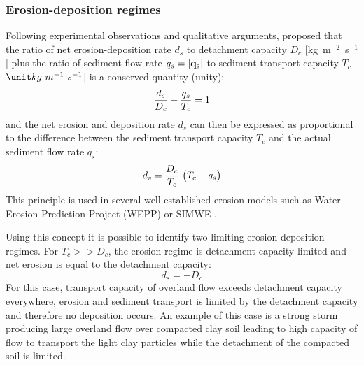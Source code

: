 \documentclass[gmd, manuscript]{copernicus}
\begin{document}
\subsubsection{Erosion-deposition regimes}

Following experimental observations and qualitative arguments, \cite{Foster1977} 
proposed that the ratio of net erosion-deposition rate $d_s$ to detachment
 capacity  $D_c$  [\unit{kg~m}$^{-2}$~\unit{s}$^{-1}$] 
 plus the ratio of sediment flow rate $q_s = |{\bf q_s}|$ 
to sediment transport capacity $T_c$ [$\unit kg~m^{-1}~s^{-1}$] is
 a conserved quantity (unity):
\begin{equation}
\label{eq:foster_law}
{d_s \over D_c} + {q_s \over T_c} = 1
\end{equation}
and the net erosion and deposition rate $d_s$ can then be expressed as proportional to the difference between
the sediment transport capacity $T_c$ and the actual sediment flow rate $q_s$:
\begin{equation}
\label{eq:sigma}
d_s = {D_c \over T_c}~\bigl( T_c - q_s\bigr)
\end{equation}
\noindent
This principle is used in several well established erosion models such as Water Erosion Prediction Project (WEPP)
\citep{Flanagan2013} or SIMWE \citep{Mitas1998}. 

Using this concept it is possible to identify two limiting erosion-deposition regimes.
For $T_c >> D_c$, the erosion regime is detachment capacity limited and
net erosion is equal to the detachment capacity:
\begin{equation}
\label{eq:detachment_limited}
 d_s = -D_c
\end{equation}
For this case, transport capacity of overland flow exceeds
detachment capacity everywhere, erosion and sediment transport is limited by the detachment
capacity and therefore no deposition occurs.
An example of this case is a strong storm producing large overland flow over compacted clay soil 
leading to high capacity of flow to transport the light clay particles
while the detachment of the compacted soil is limited.
\end{document}
